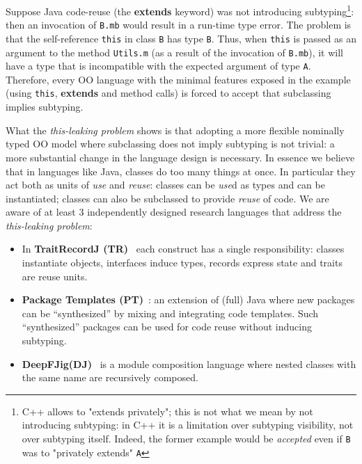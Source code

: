 Suppose Java code-reuse (the {\bf extends} keyword) was not introducing subtyping\footnote{
C++ allows to "extends privately"; this is not
what we mean by not introducing subtyping: in C++ it is a limitation over
  subtyping visibility, not over subtyping itself.  Indeed, the
  former example would be \emph{accepted} even if \lstinline{B} was to
  "privately extends" \lstinline{A}}: then an invocation of 
\lstinline{B.mb} would result in a run-time type error.
The problem is that the
self-reference \lstinline{this} in class \lstinline{B} has 
type \lstinline{B}. Thus, when \lstinline{this} is passed as an argument to 
the method \lstinline{Utils.m} (as a result of the invocation of
\lstinline{B.mb}), it will have a type that is incompatible with the
expected argument of type \lstinline{A}.  
Therefore, every OO language with the minimal features exposed in the example (using \lstinline{this},
{\bf extends} and method calls) is forced to accept that subclassing implies
subtyping.
  

What the \emph{this-leaking problem} shows is that adopting a more flexible
nominally typed OO model where subclassing does not imply subtyping is
not trivial: a more substantial change in the language design is
necessary.  In essence we believe that in languages like Java, classes do too many
things at once. In particular they act both as units of \emph{use} and
\emph{reuse}: classes can be \emph{use}d as types and can be instantiated;
classes can also be subclassed to provide \emph{reuse} of code.
We are aware of at least 3 independently designed research
languages that address the \emph{this-leaking problem}:
\begin{itemize}
\item In {\bf TraitRecordJ (TR)}~\cite{Bettini:2010:ISP:1774088.1774530,BETTINI2013521,Bettini2015282}
each construct has a single responsibility: classes instantiate objects,
interfaces induce types, records express state and traits are reuse units.
\item {\bf Package Templates (PT)}~\cite{KrogdahlMS09,DBLP:journals/taosd/AxelsenSKM12,DBLP:conf/gpce/AxelsenK12}:
an extension of (full) Java where new packages can be ``synthesized'' by mixing
and integrating code templates. 
Such ``synthesized'' packages can be used for code reuse without inducing subtyping.
\item {\bf
    DeepFJig(DJ)}~\cite{deep,servetto2014meta,fjig} is
a module composition language where nested classes with the same name are recursively composed.
\end{itemize}


